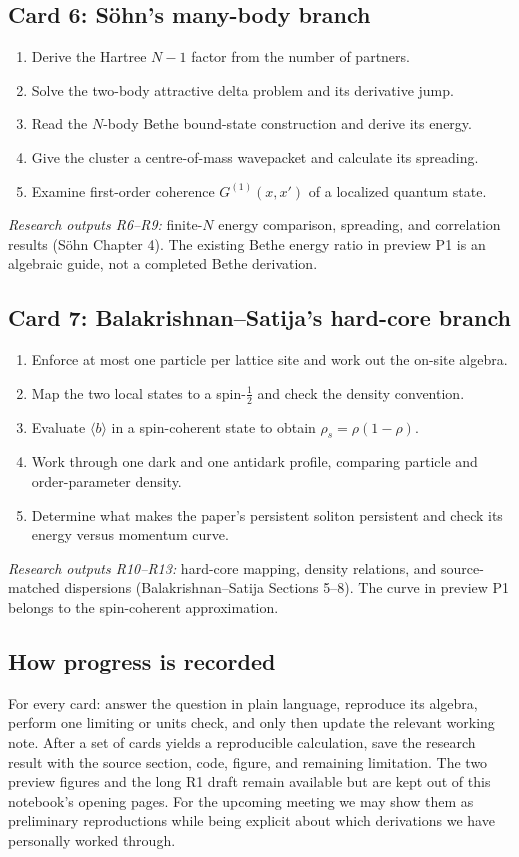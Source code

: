 \subsection{Card 6: S\"ohn's many-body branch}
\begin{enumerate}[label=6.\arabic*.,leftmargin=2.5em]
\item Derive the Hartree $N-1$ factor from the number of partners.
\item Solve the two-body attractive delta problem and its derivative jump.
\item Read the $N$-body Bethe bound-state construction and derive its energy.
\item Give the cluster a centre-of-mass wavepacket and calculate its spreading.
\item Examine first-order coherence $G^{(1)}(x,x')$ of a localized quantum state.
\end{enumerate}
\noindent\emph{Research outputs R6--R9:} finite-$N$ energy comparison, spreading, and correlation results (S\"ohn Chapter 4). The existing Bethe energy ratio in preview P1 is an algebraic guide, not a completed Bethe derivation.

\subsection{Card 7: Balakrishnan--Satija's hard-core branch}
\begin{enumerate}[label=7.\arabic*.,leftmargin=2.5em]
\item Enforce at most one particle per lattice site and work out the on-site algebra.
\item Map the two local states to a spin-$\tfrac12$ and check the density convention.
\item Evaluate $\langle b\rangle$ in a spin-coherent state to obtain $\rho_s=\rho(1-\rho)$.
\item Work through one dark and one antidark profile, comparing particle and order-parameter density.
\item Determine what makes the paper's persistent soliton persistent and check its energy versus momentum curve.
\end{enumerate}
\noindent\emph{Research outputs R10--R13:} hard-core mapping, density relations, and source-matched dispersions (Balakrishnan--Satija Sections 5--8). The curve in preview P1 belongs to the spin-coherent approximation.

\subsection{How progress is recorded}
For every card: answer the question in plain language, reproduce its algebra, perform one limiting or units check, and only then update the relevant working note. After a set of cards yields a reproducible calculation, save the research result with the source section, code, figure, and remaining limitation. The two preview figures and the long R1 draft remain available but are kept out of this notebook's opening pages. For the upcoming meeting we may show them as preliminary reproductions while being explicit about which derivations we have personally worked through.
